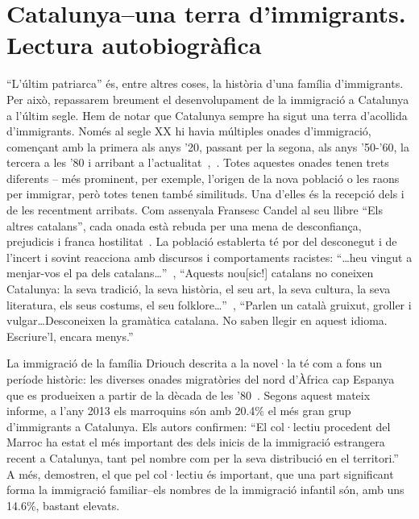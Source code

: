 \section{Catalunya--una terra d'immigrants. Lectura autobiogràfica}

``L'últim patriarca'' és, entre altres coses, la història d'una família d'immigrants.
Per això, repassarem breument el desenvolupament de la immigració a Catalunya a l'últim segle.
Hem de notar que Catalunya sempre ha sigut una terra d'acollida d'immigrants.
Només al segle XX hi havia múltiples onades d'immigració, començant amb la primera als anys '20, passant per la segona, als anys '50-'60, la tercera a les '80 i arribant a l'actualitat~\autocite[123--126]{Candel1985},~\autocite{TarPaGa2013}.
Totes aquestes onades tenen trets diferents -- més prominent, per exemple, l'origen de la nova població o les raons per immigrar, però totes tenen també similituds.
Una d'elles és la recepció dels i de les recentment arribats.
Com assenyala Fransesc Candel al seu llibre ``Els altres catalans'', cada onada està rebuda per una mena de desconfiança, prejudicis i franca hostilitat~\autocite[17]{Candel1965}.
La població establerta té por del desconegut i de l'incert i sovint reacciona amb discursos i comportaments racistes:
``\ldots heu vingut a menjar-vos el pa dels catalans\ldots''~\autocite[17]{Candel1965},
``Aquests nou[sic!] catalans no coneixen Catalunya: la seva tradició, la seva història, el seu art, la seva cultura, la seva literatura, els seus costums, el seu folklore\ldots''~\autocite[17]{Candel1965},
``Parlen un català gruixut, groller i vulgar\ldots Desconeixen la gramàtica catalana. No saben llegir en aquest idioma. Escriure'l, encara menys.''~\autocite[18]{Candel1965}

La immigració de la família Driouch descrita a la novel·la té com a fons un període històric:
les diverses onades migratòries del nord d'Àfrica cap Espanya que es produeixen a partir de la dècada de les '80~\autocite{TarPaGa2013}.
Segons aquest mateix informe, a l'any 2013 els marroquins són amb 20.4\% el més gran grup d'immigrants a Catalunya.
Els autors confirmen:
``El col·lectiu procedent del Marroc ha estat el més important des dels inicis de la immigració estrangera recent a Catalunya, tant pel nombre com per la seva distribució en el territori.''~\autocite{TarPaGa2013}
A més, demostren, el que pel col·lectiu és important, que una part significant forma la immigració familiar--els nombres de la immigració infantil són, amb uns 14.6\%, bastant elevats.


